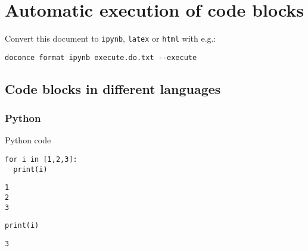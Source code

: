 \documentclass[%
oneside,                 %
final,                   %
chapterprefix=true,      %
open=right,              %
10pt]{book}
\begin{document}

\newcommand{\exercisesection}[1]{\subsection*{#1}}





\chapter{Automatic execution of code blocks}

Convert this document to \texttt{ipynb}, \texttt{latex} or \texttt{html} with e.g.:



\begin{Verbatim}[numbers=none,fontsize=\fontsize{9pt}{9pt},baselinestretch=0.95]
doconce format ipynb execute.do.txt --execute

\end{Verbatim}


\section{Code blocks in different languages}
\subsection{Python}

Python code




\begin{Verbatim}[numbers=none,fontsize=\fontsize{9pt}{9pt},baselinestretch=0.95]
for i in [1,2,3]:
  print(i)

\end{Verbatim}

\begin{Verbatim}[numbers=none,fontsize=\fontsize{9pt}{9pt},baselinestretch=0.95]
1
2
3
\end{Verbatim}



\begin{Verbatim}[numbers=none,fontsize=\fontsize{9pt}{9pt},baselinestretch=0.95]
print(i)

\end{Verbatim}

\begin{Verbatim}[numbers=none,fontsize=\fontsize{9pt}{9pt},baselinestretch=0.95]
3
\end{Verbatim}
\end{document}
